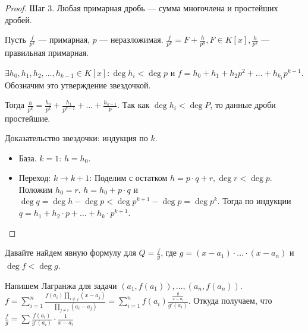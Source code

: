 \begin{proof}
    Шаг 3. Любая примарная дробь --- сумма многочлена и простейших дробей.

    Пусть $\frac{f}{p^k}$ --- примарная, $p$ --- неразложимая.  $\frac{f}{p^k} = F + \frac{h}{p^k}, F \in K[x], \frac{h}{p^k}$ --- правильная примарная. 

    $\exists h_0, h_1, h_2,\ldots, h_{k-1} \in K[x]\!: \deg h_i < \deg p$ и $f = h_0 + h_1 + h_2p^2 + \ldots + h_{k_1} p^{k-1}$. Обозначим это утверждение звездочкой.

    Тогда $\frac{h}{p^k} = \frac{h_0}{p^k} + \frac{h_1}{p^{k-1}} + \ldots + \frac{h_{k-1}}{p}$. Так как $\deg h_i < \deg P$, то данные дроби простейшие.

    Доказательство звездочки: индукция по  $k$.
     \begin{itemize}
         \item База. $k=1$:  $h = h_0$.
         \item Переход: $k \to k + 1$: Поделим с остатком  $h = p \cdot q + r, \deg r < \deg p$. Положим  $h_0 = r$.  $h = h_0 + p \cdot q$ и  $\deg q = \deg h - \deg p < \deg p^{k+1} - \deg p = \deg p^k$. Тогда по индукции  $q = h_1 + h_2 \cdot p + \ldots + h_k \cdot p^{k+1}$.
    \end{itemize}
\end{proof}

Давайте найдем явную формулу для $Q = \frac{f}{g}$, где $g=(x-a_1)\cdot \ldots \cdot (x-a_n)$ и $\deg f  < \deg g$.

Напишем Лагранжа для задачи  $(a_1, f(a_1)), \ldots, (a_n, f(a_n))$. $f = \sum\limits_{i=1}^n \frac{f(a_i)\prod\limits_{i \neq j} (x-a_j)}{\prod\limits_{j \neq i} (a_i - a_j)} = \sum\limits_{i=1}^n f(a_i) \frac{\frac{g}{x-a_i}}{g'(a_i)}$. Откуда получаем, что $\frac{f}{g} = \sum \frac{f(a_i)}{g'(a_i)} \cdot \frac{1}{x-a_i}$
